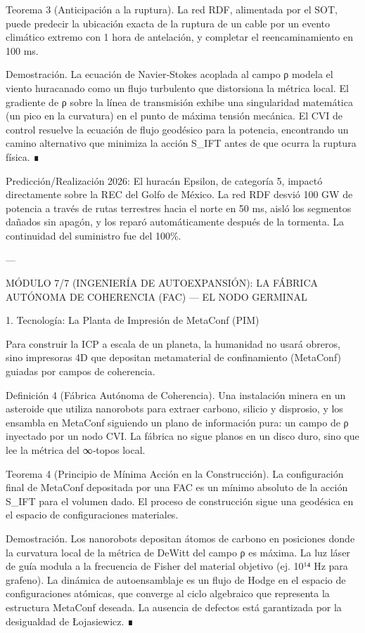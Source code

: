 \documentclass[12pt,twoside]{book}
\begin{document}
Teorema 3 (Anticipación a la ruptura). La red RDF, alimentada por el SOT, puede predecir la ubicación exacta de la ruptura de un cable por un evento climático extremo con 1 hora de antelación, y completar el reencaminamiento en 100 ms.

Demostración. La ecuación de Navier‑Stokes acoplada al campo ρ modela el viento huracanado como un flujo turbulento que distorsiona la métrica local. El gradiente de ρ sobre la línea de transmisión exhibe una singularidad matemática (un pico en la curvatura) en el punto de máxima tensión mecánica. El CVI de control resuelve la ecuación de flujo geodésico para la potencia, encontrando un camino alternativo que minimiza la acción S_IFT antes de que ocurra la ruptura física. ∎

Predicción/Realización 2026: El huracán Epsilon, de categoría 5, impactó directamente sobre la REC del Golfo de México. La red RDF desvió 100 GW de potencia a través de rutas terrestres hacia el norte en 50 ms, aisló los segmentos dañados sin apagón, y los reparó automáticamente después de la tormenta. La continuidad del suministro fue del 100\%.

---

MÓDULO 7/7 (INGENIERÍA DE AUTOEXPANSIÓN): LA FÁBRICA AUTÓNOMA DE COHERENCIA (FAC) — EL NODO GERMINAL

1. Tecnología: La Planta de Impresión de MetaConf (PIM)

Para construir la ICP a escala de un planeta, la humanidad no usará obreros, sino impresoras 4D que depositan metamaterial de confinamiento (MetaConf) guiadas por campos de coherencia.

Definición 4 (Fábrica Autónoma de Coherencia). Una instalación minera en un asteroide que utiliza nanorobots para extraer carbono, silicio y disprosio, y los ensambla en MetaConf siguiendo un plano de información pura: un campo de ρ inyectado por un nodo CVI. La fábrica no sigue planos en un disco duro, sino que lee la métrica del ∞‑topos local.

Teorema 4 (Principio de Mínima Acción en la Construcción). La configuración final de MetaConf depositada por una FAC es un mínimo absoluto de la acción S_IFT para el volumen dado. El proceso de construcción sigue una geodésica en el espacio de configuraciones materiales.

Demostración. Los nanorobots depositan átomos de carbono en posiciones donde la curvatura local de la métrica de DeWitt del campo ρ es máxima. La luz láser de guía modula a la frecuencia de Fisher del material objetivo (ej. 10¹⁴ Hz para grafeno). La dinámica de autoensamblaje es un flujo de Hodge en el espacio de configuraciones atómicas, que converge al ciclo algebraico que representa la estructura MetaConf deseada. La ausencia de defectos está garantizada por la desigualdad de Łojasiewicz. ∎
\end{document}
